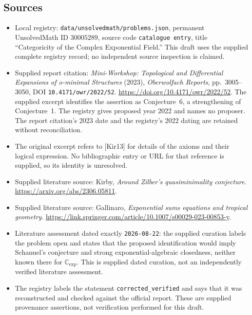 \documentclass[11pt]{article}
\begin{document}
\subsection{Sources}
\begin{itemize}
\item Local registry: \texttt{data/unsolvedmath/problems.json}, permanent UnsolvedMath ID \(30005289\), source code \texttt{catalogue entry}, title ``Categoricity of the Complex Exponential Field.'' This draft uses the supplied complete registry record; no independent source inspection is claimed.
\item Supplied report citation: \emph{Mini-Workshop: Topological and Differential Expansions of o-minimal Structures} (2023), \emph{Oberwolfach Reports}, pp.~3005--3050, DOI \texttt{10.4171/owr/2022/52}. \url{https://doi.org/10.4171/owr/2022/52}. The supplied excerpt identifies the assertion as Conjecture~6, a strengthening of Conjecture~1. The registry gives proposed year 2022 and names no proposer. The report citation's 2023 date and the registry's 2022 dating are retained without reconciliation.
\item The original excerpt refers to \textnormal{[Kir13]} for details of the axioms and their logical expression. No bibliographic entry or URL for that reference is supplied, so its identity is unresolved.
\item Supplied literature source: Kirby, \emph{Around Zilber's quasiminimality conjecture}. \url{https://arxiv.org/abs/2306.05811}.
\item Supplied literature source: Gallinaro, \emph{Exponential sums equations and tropical geometry}. \url{https://link.springer.com/article/10.1007/s00029-023-00853-y}.
\item Literature assessment dated exactly \texttt{2026-08-22}: the supplied curation labels the problem open and states that the proposed identification would imply Schanuel's conjecture and strong exponential-algebraic closedness, neither known there for \(\mathbb C_{\exp}\). This is supplied dated curation, not an independently verified literature assessment.
\item The registry labels the statement \texttt{corrected\_verified} and says that it was reconstructed and checked against the official report. These are supplied provenance assertions, not verification performed for this draft.
\end{itemize}
\end{document}
